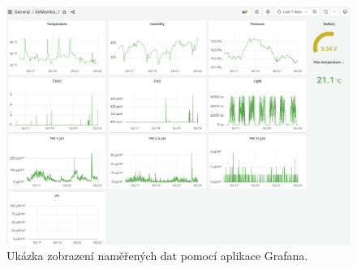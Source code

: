\begin{figure}[h]
    \centering
    \includegraphics[width=\textwidth]{obrazky/grafana.png}
    \caption{Ukázka zobrazení naměřených dat pomocí aplikace Grafana.}
    \label{fig_Grafana}
\end{figure}